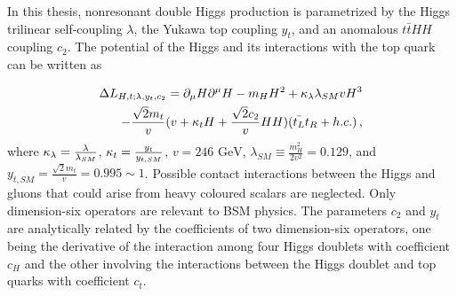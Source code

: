 In this thesis, nonresonant double Higgs production is parametrized by the Higgs trilinear
self-coupling $\lambda$, the Yukawa top coupling $y_t$, and an anomalous $t\bar{t}HH$ coupling $c_2$.
The potential of the Higgs and its interactions with the top quark can be written as

\begin{equation}
\begin{split}
\Delta L_{H,t;\lambda,y_t,c_2} = 
\partial_{\mu} H \partial^{\mu} H - m_H H^2 + \kappa_{\lambda} \lambda_{SM} v H^3 \\
- \frac{\sqrt{2} m_t}{v}(v+  \kappa_{t}   H  +  \frac{ \sqrt{2} c_2}{v} H  H ) ( \bar{t_L}t_R + h.c.)  \,,
\end{split}
\label{eq:Hpot}
\end{equation}
where $\kappa_{\lambda} = \frac{\lambda}{\lambda_{SM}}$, $\kappa_{t} = \frac{y_t}{y_{t,SM}}$, $v = 246 \mbox{ GeV}$, $\lambda_{SM} \equiv \frac{m_H^2}{2 v^2} = 0.129$, and
$y_{t,SM} = \frac{\sqrt{2} m_t}{v} = 0.995 \sim 1$. Possible contact interactions between the
Higgs and gluons that could arise from heavy coloured scalars are neglected.
Only dimension-six operators are relevant to BSM physics. The parameters $c_2$ and $y_t$ are
analytically related by the coefficients of two dimension-six operators, one being the
derivative of the interaction among four Higgs doublets with coefficient $c_H$
and the other involving the interactions between the Higgs doublet and top quarks
with coefficient $c_t$.

